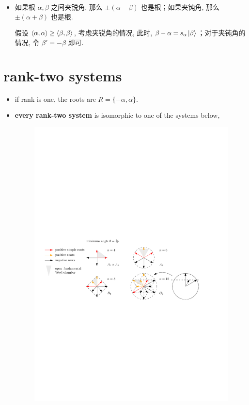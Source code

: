 \begin{itemize}
	\item 如果根 $\alpha, \beta$ 之间夹锐角, 那么 $\pm (\alpha - \beta)$ 也是根；如果夹钝角, 那么 $\pm (\alpha + \beta)$ 也是根.
	
	\begin{tcolorbox}[title=proof:]
		假设 $\braket{\alpha, \alpha} \geq \braket{\beta, \beta}$, 考虑夹锐角的情况, 此时, $\beta - \alpha = s_\alpha \ket{\beta}$；对于夹钝角的情况, 令 $\beta' = - \beta$ 即可.
	\end{tcolorbox}
\end{itemize}

\section{rank-two systems}
\begin{itemize}
	\item if rank is one, the roots are $R = \{- \alpha, \alpha\}$.
	
	\item \textbf{every rank-two system} is isomorphic to one of the systems below,
	
	\begin{figure}[H]
		\centering
		\includegraphics[scale=1]{figures/the rank-two root systems.pdf}
	\end{figure}
	

\end{itemize}
